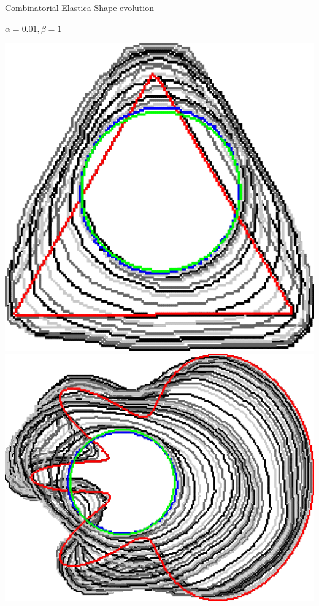 \begin{frame}
	{Combinatorial Elastica}	
	{Shape evolution}

\begin{center}
$\alpha=0.01, \beta=1$
\end{center}
\begin{minipage}{0.49\textwidth}
\center
\includegraphics[scale=0.15]{figures/combinatorial-elastica/flow/ii/elastica/len_pen_0.01000/jonctions_1/curve_segs_4/best/gs_0.25000/triangle.png}\\[1em]
\includegraphics[scale=0.18]{figures/combinatorial-elastica/flow/ii/elastica/len_pen_0.01000/jonctions_1/curve_segs_4/best/gs_0.25000/flower.png}

\end{minipage}
\end{frame}
